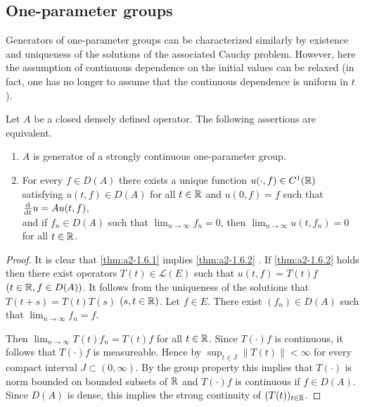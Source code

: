 \subsection{One-parameter groups} \label{subsec:a2-1.se2}
Generators of one-parameter groups can be characterized similarly by existence and uniqueness of the solutions of the associated Cauchy problem.
However, here the assumption of continuous dependence on the initial values can be relaxed (in fact, one has no longer to assume that the continuous dependence is uniform in $t$).
\begin{theorem}\label{thm:a2-1.6}
Let $A$ be a closed densely defined operator.
The following assertions are equivalent.
\begin{enumerate}[\upshape (a)]
\item \label{thm:a2-1.6.1}
$A$ is generator of a strongly continuous one-parameter group.
\item  \label{thm:a2-1.6.2}
For every $f \in D(A)$ there exists a unique function $u(\cdot,f) \in C^{1}(\mathbb{R})$ satisfying $u(t,f) \in D(A)$ for all $t \in \mathbb{R}$ and $u(0,f) = f$ such that $\frac{\mathop{}\!\mathrm{d}{}}{\mathop{}\!\mathrm{d}{t}}u = Au(t,f)$, \\
and if $f_{n} \in D(A)$ such that $\lim_{n \to \infty} f_{n} = 0$, then $\lim_{n \to \infty} u(t,f_{n}) = 0$ for all $t \in \mathbb{R}$.
\end{enumerate}
\end{theorem}
\begin{proof}
It is clear that \ref{thm:a2-1.6.1}   implies \ref{thm:a2-1.6.2} . 
If \ref{thm:a2-1.6.2}   holds then there exist operators $T(t) \in \mathcal{L}(E)$ such that $u(t,f) = T(t)f$ $(t \in \mathbb{R}, f \in D(A))$.
It follows from the uniqueness of the solutions that $T(t+s) = T(t)T(s)$ $(s,t \in \mathbb{R})$.
Let $f \in E$. 
There exist $(f_{n}) \in D(A)$ such that $\lim_{n \to \infty} f_{n} = f$.

Then $\lim_{n \to \infty} T(t)f_{n} = T(t)f$ for all $t \in \mathbb{R}$.
Since $T(\cdot)f$ is continuous, it follows that $T(\cdot)f$ is measureable.
Hence by 
\citet[10.2.1]{hillephillips:1957} $\sup_{t \in J}\|T(t)\| < \infty$ for every compact interval $J \subset (0,\infty)$.
By the group property this implies that $T(\cdot)$ is norm bounded on bounded subsets of $\mathbb{R}$ and
$T(\cdot)f$ is continuous if $f \in D(A)$.
Since $D(A)$ is dense, this implies the strong continuity of $(T(t))_{t \in \mathbb{R}}$.
\end{proof}
